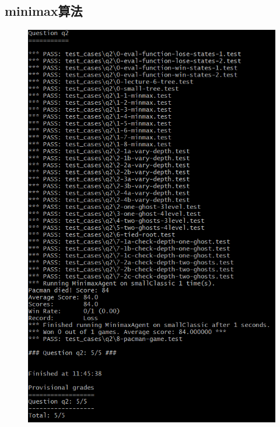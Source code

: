 \documentclass{ctexart}
\begin{document}
\subsection{\hei minimax算法}
\begin{figure}[H]	
	\centering	
	\includegraphics[scale=0.6]{mini.png}
		
\end{figure}
\end{document}
